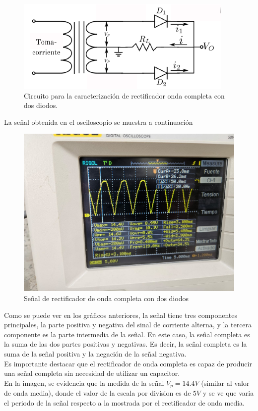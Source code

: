 \documentclass[10pt,letterpaper]{article}
\begin{document}
\begin{figure}[H]
	\centering
	\includegraphics[scale=1.2]{OndaCompleta2.png}
	\caption{Circuito para la caracterización de rectificador onda completa con dos diodos.}
	\label{fig:enter-label}
\end{figure}

La señal obtenida en el osciloscopio se muestra a continuación

\begin{figure}[H]
	\centering
	\includegraphics[scale=.35]{Osc_OndaCompleta.jpg}
	\caption{Señal de rectificador de onda completa con dos diodos}
	\label{fig:enter-label}
\end{figure}

Como se puede ver en los gráficos anteriores, la señal tiene tres componentes principales,
la parte positiva y negativa del sinal de corriente alterna, y la tercera componente es la
parte intermedia de la señal. En este caso, la señal completa es la suma de las dos partes
positivas y negativas. Es decir, la señal completa es la suma de la señal positiva y la
negación de la señal negativa.\\
Es importante destacar que el rectificador de onda completa es capaz de producir una señal
completa sin necesidad de utilizar un capacitor.\\
En la imagen, se evidencia que la medida de la señal $V_p=14.4 V$ (similar al valor de onda media), donde
el valor de la escala por division es de $5V$ y se ve que varia el periodo de la señal respecto a la mostrada por el rectificador de onda media.\\
\end{document}
